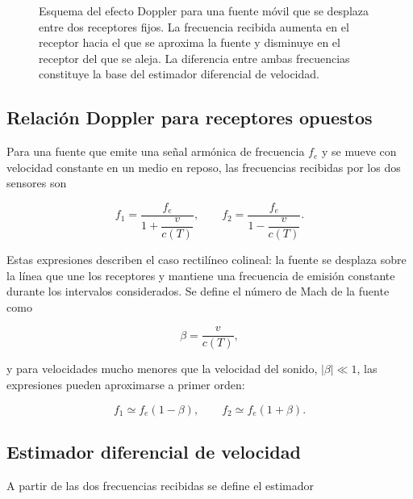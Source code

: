 \begin{figure}[!htbp]
    \centering
    
    \vspace{0.25cm}
    \caption{Esquema del efecto Doppler para una fuente móvil
    que se desplaza entre dos receptores fijos. La frecuencia
    recibida aumenta en el receptor hacia el que se aproxima
    la fuente y disminuye en el receptor del que se aleja.
    La diferencia entre ambas frecuencias constituye la base
    del estimador diferencial de velocidad.}
    \label{fig:doppler_fdoa}
\end{figure}

\subsection{Relación Doppler para receptores opuestos}

Para una fuente que emite una señal armónica de frecuencia $f_e$ y
se mueve con velocidad constante en un medio en reposo, las
frecuencias recibidas por los dos sensores son

\begin{equation}
    f_1 = \frac{f_e}{1+\dfrac{v}{c(T)}},
    \qquad
    f_2 = \frac{f_e}{1-\dfrac{v}{c(T)}}.
    \label{eq:doppler_exacto}
\end{equation}

Estas expresiones describen el caso rectilíneo colineal: la fuente
se desplaza sobre la línea que une los receptores y mantiene una
frecuencia de emisión constante durante los intervalos considerados.
Se define el número de Mach de la fuente como

\begin{equation}
    \beta = \frac{v}{c(T)},
\end{equation}

y para velocidades mucho menores que la velocidad del sonido,
$|\beta|\ll1$, las expresiones pueden aproximarse a primer orden:

\begin{equation}
    f_1 \simeq f_e(1-\beta),
    \qquad
    f_2 \simeq f_e(1+\beta).
    \label{eq:doppler_unilateral}
\end{equation}

\subsection{Estimador diferencial de velocidad}

A partir de las dos frecuencias recibidas se define el estimador

